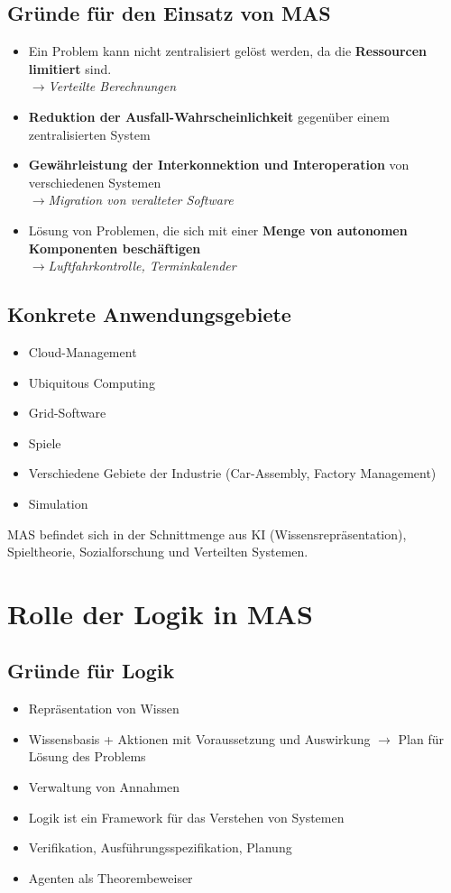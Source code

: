 \documentclass{article} %
\begin{document}
	\subsection{Gründe für den Einsatz von MAS}
	\begin{itemize}
		\item Ein Problem kann nicht zentralisiert gelöst werden, da die \textbf{Ressourcen limitiert} sind.\\
		$\rightarrow$\textit{Verteilte Berechnungen}
		\item \textbf{Reduktion der Ausfall-Wahrscheinlichkeit} gegenüber einem zentralisierten System
		\item \textbf{Gewährleistung der Interkonnektion und Interoperation} von verschiedenen Systemen\\
		$\rightarrow$\textit{Migration von veralteter Software}
		\item Lösung von Problemen, die sich mit einer \textbf{ Menge von autonomen Komponenten beschäftigen}\\
		$\rightarrow$\textit{Luftfahrkontrolle, Terminkalender}
	\end{itemize}
	\subsection{Konkrete Anwendungsgebiete}
	\begin{itemize}
		\item Cloud-Management
		\item Ubiquitous Computing
		\item Grid-Software
		\item Spiele
		\item Verschiedene Gebiete der Industrie (Car-Assembly, Factory Management)
		\item Simulation
	\end{itemize}
	MAS befindet sich in der Schnittmenge aus KI (Wissensrepräsentation), Spieltheorie, Sozialforschung und Verteilten Systemen.
	
\section{Rolle der Logik in MAS}
	\subsection{Gründe für Logik}
	\begin{itemize}
		\item Repräsentation von Wissen
		\item Wissensbasis + Aktionen mit Voraussetzung und Auswirkung $\rightarrow$ Plan für Lösung des Problems
		\item Verwaltung von Annahmen
		\item Logik ist ein Framework für das Verstehen von Systemen
		\item Verifikation, Ausführungsspezifikation, Planung
		\item Agenten als Theorembeweiser
	\end{itemize}
\end{document}
